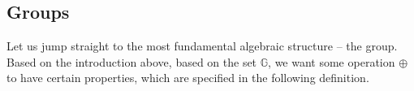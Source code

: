 \documentclass[../../book.tex]{subfiles}
\begin{document}




\subsection{Groups}

Let us jump straight to the most fundamental algebraic structure -- the group. Based on the introduction 
above, based on the set $\mathbb{G}$, we want some operation $\oplus$ to have certain properties, which 
are specified in the following definition.
\end{document}
